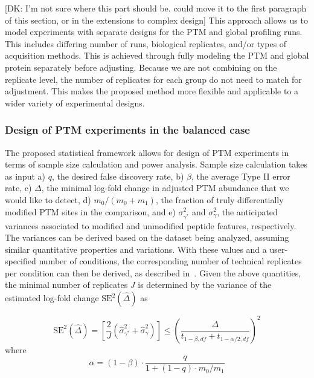 \documentclass[mcp]{article}
\numberwithin{table}{section}
\def\todo#1{{\color{red}[#1]}}
\begin{document}
\todo{DK: I'm not sure where this part should be. could move it to the first paragraph of this section, or in the extensions to complex design}
This approach allows us to model experiments with separate designs for the PTM and global profiling runs. This includes differing number of runs, biological replicates, and/or types of acquisition methods. This is achieved through fully modeling the PTM and global protein separately before adjusting. Because we are not combining on the replicate level, the number of replicates for each group do not need to match for adjustment. This makes the proposed method more flexible and applicable to a wider variety of experimental designs.

\subsubsection*{Design of PTM experiments in the balanced case}
\label{sec:design}

The proposed statistical framework allows for design of PTM experiments in terms of sample size calculation and power analysis. 
Sample size calculation takes as input a) $q$, the desired false discovery rate, b) $\beta$, the average Type II error rate, c) $\Delta$, the minimal log-fold change in adjusted PTM abundance that we would like to detect, d) $m_0 / (m_0 + m_1)$, the fraction of truly differentially modified PTM sites in the comparison, and e) $\sigma_{\gamma^{\ast}}^{2}$ and $\sigma_{\gamma}^{2}$, the anticipated variances associated to modified and unmodified peptide features, respectively. The variances can be derived based on the dataset being analyzed, assuming similar quantitative properties and variations. With these values and a user-specified number of conditions, the corresponding number of technical replicates per condition can then be derived, as described in~\cite{kutner_etal_04a}. Given the above quantities, the minimal number of replicates $J$ is determined by the variance of the estimated log-fold change $\mathrm{SE}^{2}(\hat{\Delta})$ as

\begin{equation}
\mathrm{SE}^{2}(\hat{\Delta}) = \left[ \frac{2}{J} \left( \hat{\sigma}_{\gamma^{\ast}}^{2} + \hat{\sigma}_{\gamma}^{2} \right) \right]
\leq \left( \frac{\Delta}{t_{1-\beta, df} + t_{1-\alpha /2, df}} \right)^{2}
\end{equation}
where 
\begin{equation}
\alpha = (1 - \beta) \cdot \frac{q}{1 + (1-q) \cdot m_0 / m_1}
\end{equation}
\end{document}
